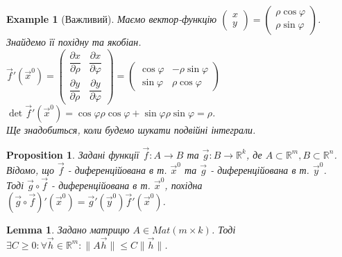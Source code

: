 \documentclass[a4paper, 10pt]{article}
\def\departial#1#2{\dfrac{\partial {#1}}{\partial {#2}}}
\theoremstyle{theoremdd}
\theoremstyle{theoremdd}
\theoremstyle{theoremdd}
\theoremstyle{theoremdd}
\newtheorem{example}[theorem]{Example}
\theoremstyle{theoremdd}
\newtheorem{proposition}[theorem]{Proposition}
\theoremstyle{theoremdd}
\theoremstyle{theoremdd}
\newtheorem{lemma}[theorem]{Lemma}
\theoremstyle{theoremdd}
\newcommand\Norm[1]{\lVert#1\rVert}
\begin{document}
\begin{example}[Важливий]
Маємо вектор-функцію $\begin{pmatrix}
x \\ y
\end{pmatrix} = \begin{pmatrix}
\rho \cos \varphi \\
\rho \sin \varphi
\end{pmatrix}$. Знайдемо її похідну та якобіан.\\
$\vec{f}'(\vec{x}^0) = \begin{pmatrix}
\departial{x}{\rho} & \departial{x}{\varphi} \\
\departial{y}{\rho} & \departial{y}{\varphi}
\end{pmatrix} = \begin{pmatrix}
\cos \varphi & -\rho \sin \varphi \\
\sin \varphi & \rho \cos \varphi
\end{pmatrix}$ \hspace{1cm} $\det \vec{f}'(\vec{x}^0) = \cos \varphi \rho \cos \varphi + \sin \varphi \rho \sin \varphi = \rho$.\\
Ще знадобиться, коли будемо шукати подвійні інтеграли.
\end{example}

\begin{proposition}
Задані функції $\vec{f}: A \to B$ та $\vec{g}: B \to \mathbb{R}^k$, де $A \subset \mathbb{R}^m, B \subset \mathbb{R}^n$.\\
Відомо, що $\vec{f}$ - диференційована в т. $\vec{x}^0$ та $\vec{g}$ - диференційована в т. $\vec{y}^0$. \\ Тоді $\vec{g} \circ \vec{f}$ - диференційована в т. $\vec{x}^0$, похідна $(\vec{g} \circ \vec{f})'(\vec{x}^0) = \vec{g}'(\vec{y}^0) \vec{f}'(\vec{x}^0)$.
\end{proposition}

\iffalse
\begin{lemma}
Задано матрицю $A \in Mat(m \times k)$. Тоді $\exists C \geq 0: \forall \vec{h} \in \mathbb{R}^m: \Norm{A \vec{h}} \leq C \Norm{\vec{h}}$.
\end{lemma}
\end{document}
